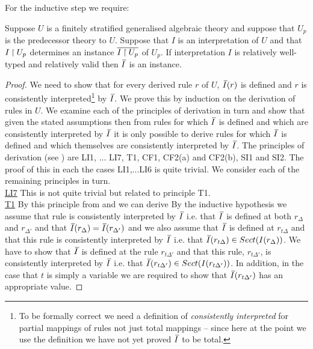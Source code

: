 For the inductive step we require:

\begin{lemma}
Suppose $U$ is a finitely stratified generalised algebraic theory and 
suppose that $U_p$ is the predecessor theory to $U$. Suppose that $I$ is an interpretation of $U$  and that  $I \mathbin{\restriction} U_p$  
determines an instance $\overline{I \mathbin{\restriction} U_p}$ of $U_p$.
If interpretation $I$ is relatively well-typed and relatively valid then $\Ibar$ is an instance.
\end{lemma}
\begin{proof} 
\newcommand {\forceSOURCEwidth}{\rule{5cm}{0pt}}  %
\newcommand {\forceTARGETwidth}{\rule{2.2cm}{0pt}}
We need to show that for every derived rule $r$ of $U$, $\Ibar(r)$ is defined and $r$ is consistently interpreted\footnote{To be formally correct we need a definition of \textit{consistently interpreted} for partial mappings of rules not just total mappings -- since here at the point we use the definition we have not yet proved $\Ibar$ to be total.} by $\Ibar$. 
We prove this by induction on the derivation of rules in $U$. We examine each of the principles of derivation in turn
and show that given the stated assumptions then from rules for which $\Ibar$ is defined and which are consistently interpreted by $\Ibar$ 
it is only possible to derive rules for which $\Ibar$ is defined and which themselves are consistently interpreted by $\Ibar$.
The principles of derivation (see \cite{Cartmell86}) are LI1, ... LI7, T1, CF1, CF2(a) and CF2(b), SI1 and SI2. 
The proof of this  in each the cases  LI1,...LI6 is quite trivial. We consider each of the remaining principles in turn. 
 \\
\underline{LI7} This is not quite trivial but related to principle T1.  \\


\underline{T1}
By this principle from  and  we can derive 
By the inductive hypothesis we assume that rule   is consistently interpreted by $\Ibar$ i.e. that
$\Ibar$ is defined at both $r_\Delta$ and $r_{\Delta'}$  and that $\Ibar(r_\Delta) = \Ibar(r_{\Delta'})$
and we also assume that $\Ibar$ is defined at $r_{t\Delta}$ and that this rule
is consistently interpreted by $\Ibar$ i.e. that $\Ibar(r_{t\Delta}) \in Sect(I(r_{\Delta}))$.
We have to show that $\Ibar$ is defined at the rule $r_{t\Delta'}$ and that this rule, $r_{t\Delta'}$, is consistently interpreted 
by $\Ibar$ i.e. that $\Ibar(r_{t\Delta'}) \in Sect(I(r_{t\Delta'}))$. 
In addition, in the case that  $t$ is simply a variable we are required to show  that $\Ibar(r_{t\Delta'})$ has an appropriate value.


\end{proof}
